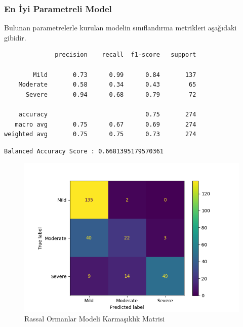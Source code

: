 \documentclass[12pt,twoside]{deuthesis}
\begin{document}
\hypertarget{en-iyi-parametreli-model-1}{%
\subsubsection{En İyi Parametreli Model}\label{en-iyi-parametreli-model-1}}

Bulunan parametrelerle kurulan modelin sınıflandırma metrikleri aşağıdaki gibidir.
\begin{verbatim}
              precision    recall  f1-score   support

        Mild       0.73      0.99      0.84       137
    Moderate       0.58      0.34      0.43        65
      Severe       0.94      0.68      0.79        72

    accuracy                           0.75       274
   macro avg       0.75      0.67      0.69       274
weighted avg       0.75      0.75      0.73       274
\end{verbatim}
\begin{verbatim}
Balanced Accuracy Score : 0.6681395179570361
\end{verbatim}
\begin{figure}

{\centering \includegraphics[width=1.05\linewidth,height=0.6\textheight]{figure/rfc_conf} 

}

\caption{Rassal Ormanlar Modeli Karmaşıklık Matrisi}\label{fig:unnamed-chunk-27}
\end{figure}
\end{document}
